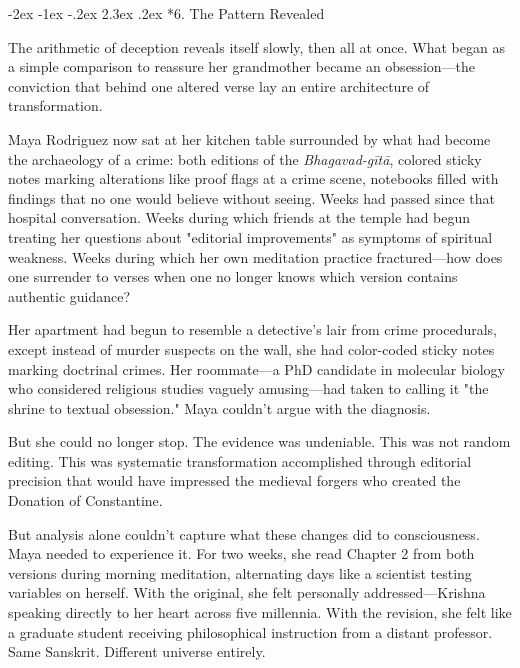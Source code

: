 \documentclass[12pt,twoside]{book}
\makeatletter
\renewcommand\section{\@startsection{section}{1}{\z@}%
{-3.5ex \@plus -1ex \@minus -.2ex}%
{2.3ex \@plus.2ex}%
{\normalfont\Large\bfseries}}
\let\oldsection\section
\renewcommand{\section}[1]{\needspace{4\baselineskip}\oldsection{#1}}
\def\cleardoublepage{\clearpage\if@twoside \ifodd\c@page\else\hbox{}\thispagestyle{empty}\newpage\if@twocolumn\hbox{}\newpage\fi\fi\fi}
\renewcommand\section{\@startsection{section}{1}{\z@}%
{-2ex \@plus -1ex \@minus -.2ex}%
{2.3ex \@plus.2ex}%
{\normalfont\Large\bfseries}}
\makeatother
\begin{document}
\cleardoublepage
\vspace*{0.20\textheight}
\section*{6. The Pattern Revealed}
\thispagestyle{chapterpage}

\normalfont\justifying
The arithmetic of deception reveals itself slowly, then all at once. What began as a simple comparison to reassure her grandmother became an obsession—the conviction that behind one altered verse lay an entire architecture of transformation.

Maya Rodriguez now sat at her kitchen table surrounded by what had become the archaeology of a crime: both editions of the \emph{Bhagavad-gītā}, colored sticky notes marking alterations like proof flags at a crime scene, notebooks filled with findings that no one would believe without seeing. Weeks had passed since that hospital conversation. Weeks during which friends at the temple had begun treating her questions about "editorial improvements" as symptoms of spiritual weakness. Weeks during which her own meditation practice fractured—how does one surrender to verses when one no longer knows which version contains authentic guidance?

Her apartment had begun to resemble a detective's lair from crime procedurals, except instead of murder suspects on the wall, she had color-coded sticky notes marking doctrinal crimes. Her roommate—a PhD candidate in molecular biology who considered religious studies vaguely amusing—had taken to calling it "the shrine to textual obsession." Maya couldn't argue with the diagnosis.

But she could no longer stop. The evidence was undeniable. This was not random editing. This was systematic transformation accomplished through editorial precision that would have impressed the medieval forgers who created the Donation of Constantine.

But analysis alone couldn't capture what these changes did to consciousness. Maya needed to experience it. For two weeks, she read Chapter 2 from both versions during morning meditation, alternating days like a scientist testing variables on herself. With the original, she felt personally addressed—Krishna speaking directly to her heart across five millennia. With the revision, she felt like a graduate student receiving philosophical instruction from a distant professor. Same Sanskrit. Different universe entirely.
\end{document}
